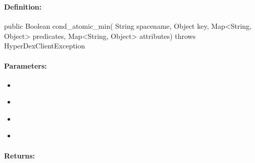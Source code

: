 \subsubsection{}
\label{api:java:cond_atomic_min}


\paragraph{Definition:}
\begin{javacode}
public Boolean cond_atomic_min(
        String spacename,
        Object key,
        Map<String, Object> predicates,
        Map<String, Object> attributes) throws HyperDexClientException
\end{javacode}

\paragraph{Parameters:}
\begin{itemize}[noitemsep]
\item {}\\

\item {}\\

\item {}\\

\item {}\\

\end{itemize}

\paragraph{Returns:}


\pagebreak
\subsubsection{}
\label{api:java:async_cond_atomic_min}


